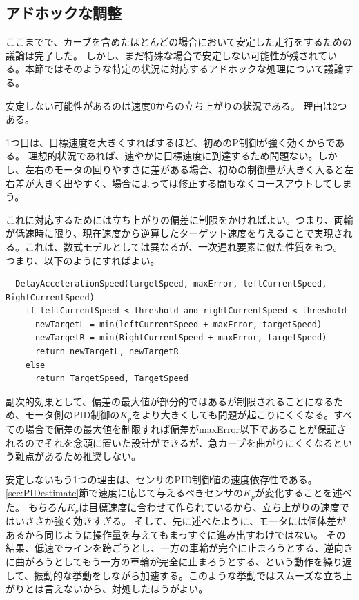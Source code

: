 \documentclass{ltjsreport}
\begin{document}
\subsection{アドホックな調整}
ここまでで、カーブを含めたほとんどの場合において安定した走行をするための議論は完了した。
しかし、まだ特殊な場合で安定しない可能性が残されている。本節ではそのような特定の状況に対応するアドホックな処理について議論する。

安定しない可能性があるのは速度0からの立ち上がりの状況である。
理由は2つある。

1つ目は、目標速度を大きくすればするほど、初めのP制御が強く効くからである。
理想的状況であれば、速やかに目標速度に到達するため問題ない。しかし、左右のモータの回りやすさに差がある場合、初めの制御量が大きく入ると左右差が大きく出やすく、場合によっては修正する間もなくコースアウトしてしまう。

これに対応するためには立ち上がりの偏差に制限をかければよい。つまり、両輪が低速時に限り、現在速度から逆算したターゲット速度を与えることで実現される。これは、数式モデルとしては異なるが、一次遅れ要素に似た性質をもつ。
つまり、以下のようにすればよい。
\begin{verbatim}
  DelayAccelerationSpeed(targetSpeed, maxError, leftCurrentSpeed, RightCurrentSpeed)
    if leftCurrentSpeed < threshold and rightCurrentSpeed < threshold
      newTargetL = min(leftCurrentSpeed + maxError, targetSpeed)
      newTargetR = min(RightCurrentSpeed + maxError, targetSpeed)
      return newTargetL, newTargetR
    else
      return TargetSpeed, TargetSpeed
\end{verbatim}
副次的効果として、偏差の最大値が部分的ではあるが制限されることになるため、モータ側のPID制御の$K_p$をより大きくしても問題が起こりにくくなる。すべての場合で偏差の最大値を制限すれば偏差がmaxError以下であることが保証されるのでそれを念頭に置いた設計ができるが、急カーブを曲がりにくくなるという難点があるため推奨しない。

安定しないもう1つの理由は、センサのPID制御値の速度依存性である。
\ref{sec:PIDestimate}節で速度に応じて与えるべきセンサの$K_p$が変化することを述べた。
もちろん$K_p$は目標速度に合わせて作られているから、立ち上がりの速度ではいささか強く効きすぎる。
そして、先に述べたように、モータには個体差があるから同じように操作量を与えてもまっすぐに進み出すわけではない。
その結果、低速でラインを跨ごうとし、一方の車輪が完全に止まろうとする、逆向きに曲がろうとしてもう一方の車輪が完全に止まろうとする、という動作を繰り返して、振動的な挙動をしながら加速する。このような挙動ではスムーズな立ち上がりとは言えないから、対処したほうがよい。
\end{document}
